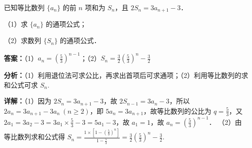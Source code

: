 \begin{question}[points=12]
已知等比数列 $\{a_n\}$ 的前 $n$ 项和为 $S_n$，且 $2S_n = 3a_{n+1} - 3$．

（1）求 $\{a_n\}$ 的通项公式；

（2）求数列 $\{S_n\}$ 的通项公式．
\begin{solution}
\textbf{答案：}（1）$a_n = \left(\frac{5}{3}\right)^{n-1}$；（2）$S_n = \frac{3}{2}\left(\frac{5}{3}\right)^n - \frac{3}{2}$

\textbf{分析：}（1）利用退位法可求公比，再求出首项后可求通项；（2）利用等比数列的求和公式可求 $S_n$.

\textbf{详解：}（1）因为 $2S_n = 3a_{n+1} - 3$，故 $2S_{n-1} = 3a_n - 3$，所以 $2a_n = 3a_{n+1} - 3a_n\ (n \ge 2)$，即 $5a_n = 3a_{n+1}$，故等比数列的公比为 $q = \frac{5}{3}$，又 $2a_1 = 3a_2 - 3 = 3a_1 \times \frac{5}{3} - 3 = 5a_1 - 3$，故 $a_1 = 1$，故 $a_n = \left(\frac{5}{3}\right)^{n-1}$．
（2）由等比数列求和公式得 $S_n = \frac{1 \times \left[1 - \left(\frac{5}{3}\right)^n\right]}{1 - \frac{5}{3}} = \frac{3}{2}\left(\frac{5}{3}\right)^n - \frac{3}{2}$.
\end{solution}
\end{question}

